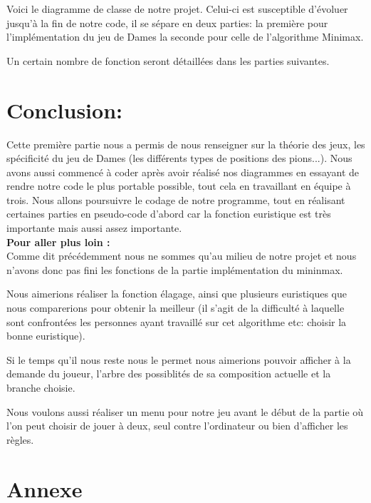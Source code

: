 \documentclass[12,french]{report}
\begin{document}
Voici le diagramme de classe de notre projet. Celui-ci est susceptible
d'évoluer jusqu'à la fin de notre code, il se sépare en deux parties:
la première pour l'implémentation du jeu de Dames la seconde pour
celle de l'algorithme Minimax.

Un certain nombre de fonction seront détaillées dans les parties suivantes.

\chapter*{Conclusion:}

Cette première partie nous a permis de nous renseigner sur la théorie
des jeux, les spécificité du jeu de Dames (les différents types de
positions des pions...). Nous avons aussi commencé à coder après avoir
réalisé nos diagrammes en essayant de rendre notre code le plus portable
possible, tout cela en travaillant en équipe à trois. Nous allons
poursuivre le codage de notre programme, tout en réalisant certaines
parties en pseudo-code d'abord car la fonction euristique est très
importante mais aussi assez importante.\\

\textbf{Pour aller plus loin :} \\

Comme dit précédemment nous ne sommes qu'au milieu de notre projet
et nous n'avons donc pas fini les fonctions de la partie implémentation
du mininmax.

Nous aimerions réaliser la fonction élagage, ainsi que plusieurs euristiques
que nous comparerions pour obtenir la meilleur (il s'agit de la difficulté
à laquelle sont confrontées les personnes ayant travaillé sur cet
algorithme etc: choisir la bonne euristique).

Si le temps qu'il nous reste nous le permet nous aimerions pouvoir
afficher à la demande du joueur, l'arbre des possiblités de sa composition
actuelle et la branche choisie. 

Nous voulons aussi réaliser un menu pour notre jeu avant le début
de la partie où l'on peut choisir de jouer à deux, seul contre l'ordinateur
ou bien d'afficher les règles.


\chapter*{Annexe}
\end{document}
